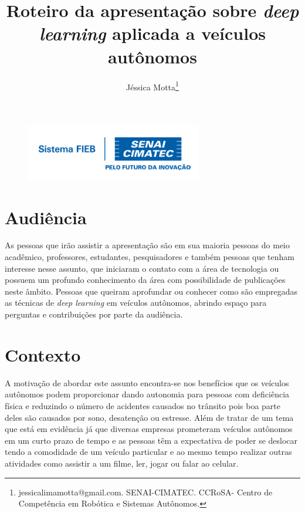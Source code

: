 \documentclass[12pt,a4paper]{article}
\begin{document}
 
\begin{figure}
    \flushright
    \includegraphics[scale=0.5]{Logo_senai.png}
\end{figure}

\title{Roteiro da apresentação sobre \emph{deep learning} aplicada a veículos autônomos}
\author{Jéssica Motta\thanks{jessicalimamotta@gmail.com. SENAI-CIMATEC. CCRoSA- Centro de Competência em Robótica e Sistemas Autônomos.}}
 

    \maketitle
    \singlespacing

    \section{Audiência}

    \par As pessoas que irão assistir a apresentação são em sua maioria pessoas do meio acadêmico, professores, estudantes, pesquisadores e também pessoas que tenham interesse nesse assunto, que iniciaram o contato com a área de tecnologia ou possuem um profundo conhecimento da área com possibilidade de publicações neste âmbito. Pessoas que queiram aprofundar ou conhecer como são empregadas as técnicas de \emph{deep learning} em veículos autônomos, abrindo espaço para perguntas e contribuições por parte da audiência.

    \section{Contexto}
    \par A motivação de abordar este assunto encontra-se nos benefícios que os veículos autônomos podem proporcionar dando autonomia para pessoas com deficiência física e reduzindo o número de acidentes causados no trânsito pois boa parte deles são causados por sono, desatenção ou estresse. Além de tratar de um tema que está em evidência já que diversas empresas prometeram veículos autônomos em um curto prazo de tempo e as pessoas têm a expectativa de poder se deslocar tendo a comodidade de um veículo particular e ao mesmo tempo realizar outras atividades como assistir a um filme, ler, jogar ou falar ao celular.
  
\end{document}

